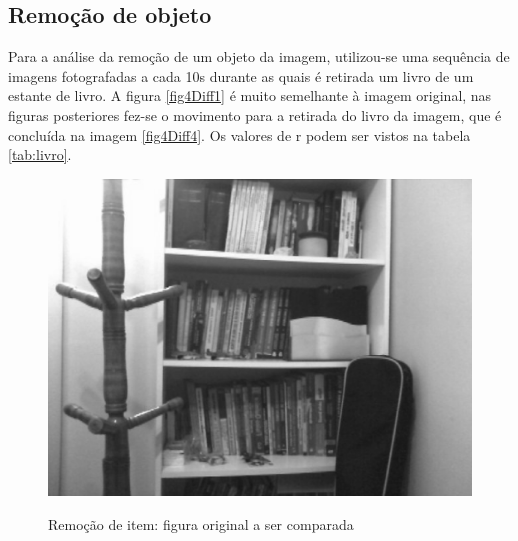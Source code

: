 \documentclass[10pt,a4paper]{article}
\begin{document}
\newpage
\subsection{Remoção de objeto}
Para a análise da remoção de um objeto da imagem, utilizou-se uma
sequência de imagens fotografadas a cada 10s durante as quais é retirada
um livro de um estante de livro.
A figura \ref{fig4Diff1} é muito semelhante à imagem original, nas
figuras posteriores fez-se o movimento para a retirada do livro da
imagem, que é concluída na imagem \ref{fig4Diff4}.
Os valores de r podem ser vistos na tabela \ref{tab:livro}.

\begin{figure}[h!]
\begin{center}
\includegraphics[scale=0.25]{photos/livros/gBase} \label{livro}
\caption{Remoção de item: figura original a ser comparada}
\end{center}
\end{figure}
\vspace{-0.5cm}
\end{document}
